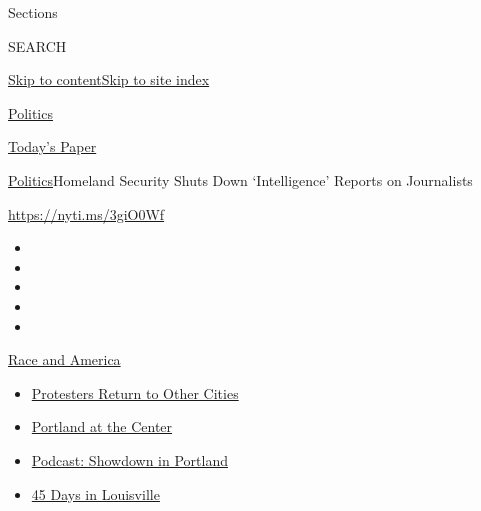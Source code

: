 Sections

SEARCH

\protect\hyperlink{site-content}{Skip to
content}\protect\hyperlink{site-index}{Skip to site index}

\href{https://www.nytimes3xbfgragh.onion/section/politics}{Politics}

\href{https://myaccount.nytimes3xbfgragh.onion/auth/login?response_type=cookie\&client_id=vi}{}

\href{https://www.nytimes3xbfgragh.onion/section/todayspaper}{Today's
Paper}

\href{/section/politics}{Politics}\textbar{}Homeland Security Shuts Down
`Intelligence' Reports on Journalists

\url{https://nyti.ms/3giO0Wf}

\begin{itemize}
\item
\item
\item
\item
\item
\end{itemize}

\href{https://www.nytimes3xbfgragh.onion/news-event/george-floyd-protests-minneapolis-new-york-los-angeles?action=click\&pgtype=Article\&state=default\&region=TOP_BANNER\&context=storylines_menu}{Race
and America}

\begin{itemize}
\tightlist
\item
  \href{https://www.nytimes3xbfgragh.onion/2020/07/26/us/protests-portland-seattle-trump.html?action=click\&pgtype=Article\&state=default\&region=TOP_BANNER\&context=storylines_menu}{Protesters
  Return to Other Cities}
\item
  \href{https://www.nytimes3xbfgragh.onion/2020/07/24/us/portland-oregon-protests-white-race.html?action=click\&pgtype=Article\&state=default\&region=TOP_BANNER\&context=storylines_menu}{Portland
  at the Center}
\item
  \href{https://www.nytimes3xbfgragh.onion/2020/07/23/podcasts/the-daily/portland-protests.html?action=click\&pgtype=Article\&state=default\&region=TOP_BANNER\&context=storylines_menu}{Podcast:
  Showdown in Portland}
\item
  \href{https://www.nytimes3xbfgragh.onion/interactive/2020/07/16/us/black-lives-matter-protests-louisville-breonna-taylor.html?action=click\&pgtype=Article\&state=default\&region=TOP_BANNER\&context=storylines_menu}{45
  Days in Louisville}
\end{itemize}

